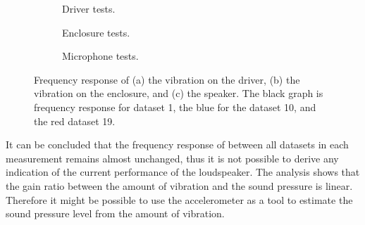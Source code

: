 \begin{figure}[H]
\centering
\begin{subfigure}[t]{0.37\textwidth}
	
	\caption{Driver tests.}
	\label{fig:freq_responsedrivercomb}
\end{subfigure}
\begin{subfigure}[t]{0.28\textwidth}
	
	\caption{Enclosure tests.}
	\label{fig:freq_responsecomb}
\end{subfigure}
\begin{subfigure}[t]{0.32\textwidth}
	
	\caption{Microphone tests.}
	\label{fig:freq_responsecomb1}
\end{subfigure}
\caption{Frequency response of (a) the vibration on the driver, (b) the vibration on the enclosure, and (c) the speaker. The black graph is frequency response for dataset 1, the blue for the dataset 10, and the red dataset 19. }
\label{fig:freq_response_comb}
\end{figure}

It can be concluded that the frequency response of between all datasets in each measurement remains almost unchanged, thus it is not possible to derive any indication of the current performance of the loudspeaker. The analysis shows that the gain ratio between the amount of vibration and the sound pressure is linear. Therefore it might be possible to use the accelerometer as a tool to estimate the sound pressure level from the amount of vibration.









